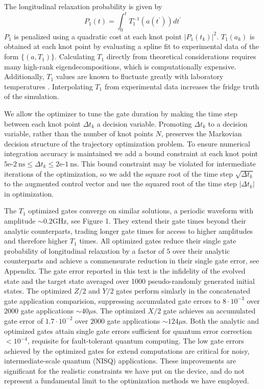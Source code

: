 \documentclass[
  amsfonts,
  amsmath,
  tbtags,
  amssymb,
  aps,
  nobibnotes,
  twocolumn,
  superscriptaddress,
]{revtex4-2}
\begin{document}
The longitudinal relaxation probability is given by
\begin{equation}
  P_{1}(t) = \int_{0}^{t} T_{1}^{-1}(a(t^{\prime})) dt^{\prime}
\end{equation}
$P_{1}$ is penalized using a quadratic cost at each knot point
${\lvert P_{1}(t_{k}) \rvert}^{2}$.
$T_{1}(a_{k})$ is obtained at each knot point by evaluating
a spline fit to experimental data of the form $\{(a, T_{1})\}$.
Calculating $T_{1}$ directly from theoretical
considerations requires many high-rank
eigendecompositions, which
is computationally expensive. Additionally,
$T_{1}$ values are known to fluctuate greatly
with laboratory temperatures \cite{klimov2018fluctuations}.
Interpolating $T_{1}$ from experimental data increases
the fridge truth of the simulation.

We allow the optimizer to tune the gate duration by
making the time step between each knot point $\Delta t_{k}$
a decision variable. Promoting $\Delta t_{k}$ to a decision variable, rather
than the number of knot points $N$, preserves the
Markovian decision structure of the trajectory
optimization problem. To ensure numerical
integration accuracy is maintained we add a bound
constraint at each knot point
$5\textrm{e-}2 \ \textrm{ns} \le
\Delta t_{k} \le 2\textrm{e-}1 \ \textrm{ns}$.
This bound constraint may be
violated for intermediate iterations of the optimization,
so we add the square root of the time step $\sqrt{\Delta t_{k}}$
to the augmented control vector and use the squared root
of the time step $\lvert \Delta t_{k} \rvert$ in optimization.

The $T_{1}$ optimized gates converge on similar solutions, a periodic
waveform with amplitude $\sim 0.2 \textrm{GHz}$, see Figure 1.
They extend their gate times
beyond their analytic counterparts, trading longer gate times for access
to higher amplitudes and therefore higher $T_{1}$ times. All optimized gates reduce
their single gate probability of longitudinal relaxation by a factor of $5$ over
their analytic counterparts and achieve a commensurate reduction in their single gate error,
see Appendix. The gate error reported in this text is the infidelity
of the evolved state and the target state averaged over 1000 pseudo-randomly
generated initial states. The optimized $Z/2$ and $Y/2$ gates perform simlarly in
the concatenated gate application comparision, suppressing accumulated gate errors to $8 \cdot 10^{-3}$
over $2000$ gate applications $\sim 40 \mu\textrm{s}$. The optimized $X/2$ gate
achieves an accumulated gate error of $1.7 \cdot 10^{-2}$ over $2000$ gate applications $\sim 124 \mu\textrm{s}$.
Both the analytic and optimized gates attain single gate errors sufficient for
quantum error correction $< 10^{-4}$, requisite for fault-tolerant quantum computing.
The low gate errors achieved by the optimized gates for extend computations
are critical for noisy, intermediate-scale quantum (NISQ) applications.
These improvements are significant for the realistic constraints we have put on the
device, and do not represent a fundamental limit to the optimization methods we have
employed.
\end{document}
